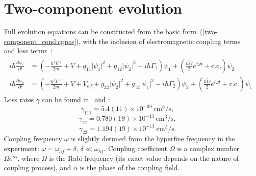 \documentclass[12pt,notitlepage]{report}
\begin{document}
\section{Two-component evolution}

Full evolution equations can be constructed from the basic form~(\ref{two-component_cond:cgpes}),
with the inclusion of electromagnetic coupling terms~\cite{pitaevskii_bec}
and loss terms~\cite{mertes_merrill_carretero-gonzalez_frantzeskakis_kevrekidis_hall_2007}:
\begin{align}
\label{two-component_evolution:cgpes}
\begin{split}
i \hbar \frac{\partial \psi_1}{\partial t} & = \left( - \frac{\hbar^2 \nabla^2}{2 m} + V +
g_{11} \lvert \psi_1 \rvert^2 + g_{12} \lvert \psi_2 \rvert^2 - i \hbar \Gamma_1 \right) \psi_1 +
\left( \frac{\hbar \tilde{\Omega}}{2}e^{i \omega t} + \textrm{c.c.} \right) \psi_2 \\
i \hbar \frac{\partial \psi_2}{\partial t} & = \left( - \frac{\hbar^2 \nabla^2}{2 m} + V + V_{hf} +
g_{22} \lvert \psi_2 \rvert^2 + g_{12} \lvert \psi_1 \rvert^2 - i \hbar \Gamma_2 \right) \psi_2 +
\left( \frac{\hbar \tilde{\Omega}}{2}e^{i \omega t} + \textrm{c.c.} \right) \psi_1
\end{split}
\end{align}
Loss rates $\gamma$ can be found in~\cite{mertes_merrill_carretero-gonzalez_frantzeskakis_kevrekidis_hall_2007}
and \cite{burt_ghrist_myatt_holland_cornell_wieman_1997}:
\[ \gamma_{111} = 5.4(11) \times 10^{-30}\ \textrm{cm}^6/\textrm{s}, \]
\[ \gamma_{12} = 0.780(19) \times 10^{-13}\ \textrm{cm}^3/\textrm{s}, \]
\[ \gamma_{22} = 1.194(19) \times 10^{-13}\ \textrm{cm}^3/\textrm{s}. \]
Coupling frequency $\omega$ is slightly detuned from the hyperfine frequency in the experiment:
$\omega = \omega_{hf} + \delta,\, \delta \ll \omega_{hf}$.
Coupling coefficient $\tilde{\Omega}$ is a complex number $\Omega e^{i \alpha}$,
where $\Omega$ is the Rabi frequency (its exact value depends on the nature of coupling process),
and $\alpha$ is the phase of the coupling field.
\end{document}
